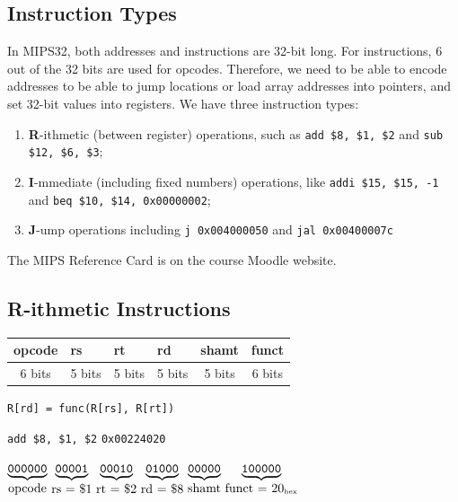 \documentclass[a4paper, 11pt]{article}
\theoremstyle{definition}
\begin{document}
\subsection{Instruction Types}
In MIPS32, both addresses and instructions are 32-bit long. For instructions, 6 out of the 32 bits are used for opcodes.
Therefore, we need to be able to encode addresses to be able to jump locations or load array addresses into pointers, and
set 32-bit values into registers. We have three instruction types: 
\begin{enumerate}
    \item \textbf{R}-ithmetic (between register) operations, such as \texttt{add \$8, \$1, \$2} and
\texttt{sub \$12, \$6, \$3};
    \item \textbf{I}-mmediate (including fixed numbers) operations, like \texttt{addi \$15, \$15, -1}
and \texttt{beq \$10, \$14, 0x00000002};
    \item \textbf{J}-ump operations including \texttt{j 0x004000050} and \texttt{jal 0x00400007c}
\end{enumerate}
The MIPS Reference Card is on the course Moodle website.

\subsection{\textbf{R}-ithmetic Instructions}
\begin{center}
\begin{tabular}{|p{1.5cm}|p{1.25cm}|p{1.25cm}|p{1.25cm}|p{1.25cm}|p{1.5cm}|}
    \hline
    \hfil opcode & \hfil rs & \hfil rt & \hfil rd & \hfil shamt & \hfil funct \\
    \hline
    \multicolumn{1}{c}{6 bits} & \multicolumn{1}{c}{5 bits} &
    \multicolumn{1}{c}{5 bits} & \multicolumn{1}{c}{5 bits} &
    \multicolumn{1}{c}{5 bits} & \multicolumn{1}{c}{6 bits}
\end{tabular}

\vspace{1ex}
\texttt{R[rd] = func(R[rs], R[rt])}

\vspace{2ex}
\texttt{add \$8, \$1, \$2} \qquad \texttt{0x00224020}

\vspace{1ex}
$\underbrace{\texttt{000000}}_{\mbox{opcode}}\,
 \underbrace{\texttt{00001}}_{\mbox{rs = \$1}}\,
 \underbrace{\texttt{00010}}_{\mbox{rt = \$2}}\,
 \underbrace{\texttt{01000}}_{\mbox{rd = \$8}}\,
 \underbrace{\texttt{00000}}_{\mbox{shamt}}\,
 \underbrace{\texttt{100000}}_{\mbox{funct = 20}_{\rm hex}}$
\end{center}
\end{document}
